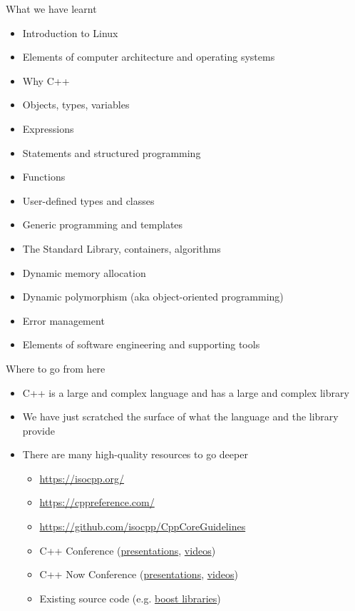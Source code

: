 \begin{frame}{What we have learnt}
  \begin{itemize}
  \item Introduction to Linux
  \item Elements of computer architecture and operating systems
  \item Why C++
  \item Objects, types, variables
  \item Expressions
  \item Statements and structured programming
  \item Functions
  \item User-defined types and classes
  \item Generic programming and templates
  \item The Standard Library, containers, algorithms
  \item Dynamic memory allocation
  \item Dynamic polymorphism (aka object-oriented programming)
  \item Error management
  \item Elements of software engineering and supporting tools
  \end{itemize}
\end{frame}

\begin{frame}{Where to go from here}

  \begin{itemize}
  \item C++ is a large and complex language and has a large and complex library
  \item We have just scratched the surface of what the language and the library provide
  \item There are many high-quality resources to go deeper
    \begin{itemize}
    \item \url{https://isocpp.org/}
    \item \url{https://cppreference.com/}
    \item \url{https://github.com/isocpp/CppCoreGuidelines}
    \item C++ Conference (\href{https://github.com/cppcon}{presentations},
      \href{https://youtube.com/cppcon}{videos})
    \item C++ Now Conference (\href{https://github.com/boostcon}{presentations},
      \href{https://youtube.com/boostcon}{videos})
    \item Existing source code (e.g. \href{https://www.boost.org/}{boost
        libraries})
    \end{itemize}
  \end{itemize}
\end{frame}
